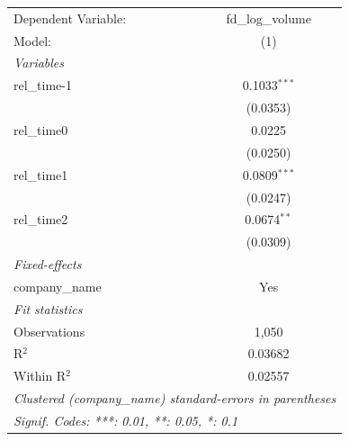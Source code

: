
\begingroup
\centering
\begin{tabular}{lc}
   \tabularnewline \midrule \midrule
   Dependent Variable: & fd\_log\_volume\\    
   Model:              & (1)\\  
   \midrule
   \emph{Variables}\\
   rel\_time-1         & 0.1033$^{***}$\\   
                       & (0.0353)\\   
   rel\_time0          & 0.0225\\   
                       & (0.0250)\\   
   rel\_time1          & 0.0809$^{***}$\\   
                       & (0.0247)\\   
   rel\_time2          & 0.0674$^{**}$\\   
                       & (0.0309)\\   
   \midrule
   \emph{Fixed-effects}\\
   company\_name       & Yes\\  
   \midrule
   \emph{Fit statistics}\\
   Observations        & 1,050\\  
   R$^2$               & 0.03682\\  
   Within R$^2$        & 0.02557\\  
   \midrule \midrule
   \multicolumn{2}{l}{\emph{Clustered (company\_name) standard-errors in parentheses}}\\
   \multicolumn{2}{l}{\emph{Signif. Codes: ***: 0.01, **: 0.05, *: 0.1}}\\
\end{tabular}
\par\endgroup


